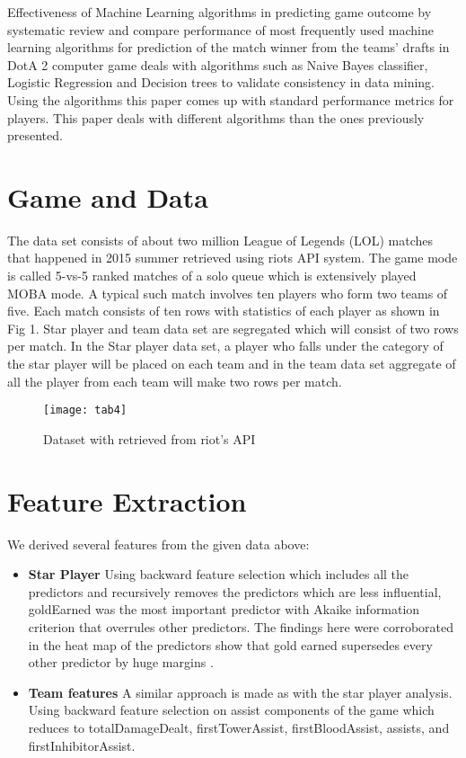\documentclass[conference]{IEEEtran}
\begin{document}
Effectiveness of Machine Learning algorithms in predicting game outcome by systematic review and compare performance of most frequently used machine learning algorithms for prediction of the match winner from the teams' drafts in DotA 2 computer game \cite{Semenov} deals with algorithms such as Naive Bayes classifier, Logistic Regression and Decision trees to validate consistency in data mining. Using the algorithms this paper comes up with standard performance metrics for players. This paper deals with different algorithms than the ones previously presented.

\section{Game and Data}
The data set consists of about two million League of Legends (LOL) matches that happened in 2015 summer retrieved using riots API system. The game mode is called 5-vs-5 ranked matches of a solo queue which is extensively played MOBA mode. A typical such match involves ten players who form two teams of five. Each match consists of ten rows with statistics of each player as shown in Fig 1. Star player and team data set are segregated which will consist of two rows per match. In the Star player data set, a player who falls under the category of the star player will be placed on each team and in the team data set aggregate of all the player from each team will make two rows per match.


\begin{figure}[!t]
\texttt{[image: tab4]}
\caption{Dataset with retrieved from riot's API}
\label{fig_sim}
\end{figure}


\section{Feature Extraction}
We derived several features from the given data above: 
\begin{itemize}
  \item \textbf{Star Player}  Using backward feature selection which includes all the predictors and recursively removes the predictors which are less influential, goldEarned was the most important predictor with Akaike information criterion that overrules other predictors. The findings here were corroborated in the heat map of the predictors show that gold earned supersedes every other predictor by huge margins \cite{Patterson}. 
  \item \textbf{Team features}  A similar approach is made as with the star player analysis. Using backward feature selection on assist components of the game which reduces to totalDamageDealt, firstTowerAssist, firstBloodAssist, assists, and firstInhibitorAssist. 
\end{itemize}
\end{document}
